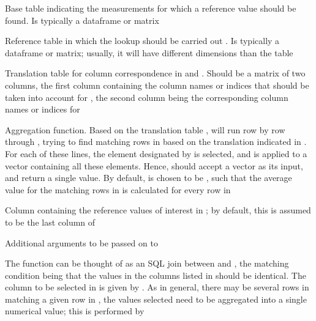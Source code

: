 \documentclass[a4paper]{book}
\begin{document}
\begin{Arguments}
\begin{ldescription}
\item[\code{descriptive\_data}] Base table indicating the measurements for which a reference value should be found. Is typically a dataframe or matrix 
\item[\code{lookup\_data}] Reference table in which the lookup should be carried out . Is typically a dataframe or matrix; usually, it will have different dimensions than the  table
\item[\code{lookup\_name\_correspondence}] Translation table for column correspondence in  and . Should be a matrix of two columns, the first column containing the
column names or indices that should be taken into account for , the second column being the corresponding column names or indices for 
\item[\code{FUN}] Aggregation function. Based on the translation table ,  will run row by row through , trying to find matching rows
in  based on the translation indicated in . For each of these lines, the element designated by  is selected, and 
 is applied to a vector containing all these elements. Hence,  should accept a vector as its input, and return a single value. By default,  is chosen to be , such that the average 
value for the matching rows in  is calculated for every row in 

\item[\code{lookup\_value\_col}] Column containing the reference values of interest in ; by default, this is assumed to be the last column of 
\item[\code{...}] Additional arguments to be passed on to 
\end{ldescription}
\end{Arguments}
%
\begin{Details}\relax
The function can be thought of as an SQL join between  and , the matching condition being that the values in the columns listed in  should be identical. The column to be selected in  is given by . As in general, there may be several rows in  matching a given row in , the values selected 
need to be aggregated into a single numerical value; this is performed by    
\end{Details}
\end{document}
